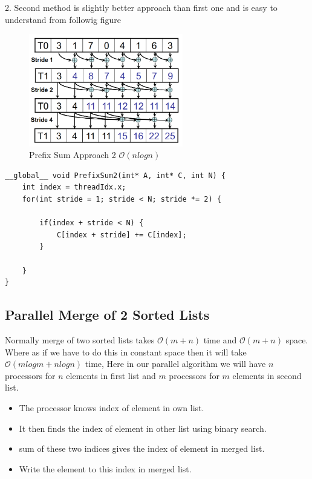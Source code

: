 \newpage

2. Second method is slightly better approach than first one and is easy to understand from followig figure

\begin{figure}[h]
    \centering
    \includegraphics[width=0.6\textwidth]{Images/prefix2method.png}
    \caption{Prefix Sum Approach 2 $\mathcal{O}(nlogn)$}
\end{figure}


\begin{lstlisting}
__global__ void PrefixSum2(int* A, int* C, int N) {
    int index = threadIdx.x;
    for(int stride = 1; stride < N; stride *= 2) {

        if(index + stride < N) {
            C[index + stride] += C[index];
        }

    }
}
\end{lstlisting}

\subsection*{Parallel Merge of 2 Sorted Lists}
Normally merge of two sorted lists takes $\mathcal{O}(m+n)$ time and $\mathcal{O}(m+n)$ space. Where as if we have to do this in constant space then it will take $\mathcal{O}(mlogm + nlogn)$ time, Here in our parallel algorithm we will have $n$ processors for $n$ elements in first list and $m$ processors for $m$ elements in second list.

\begin{itemize}
    \item The processor knows index of element in own list.
    \item It then finds the index of element in other list using binary search.
    \item sum of these two indices gives the index of element in merged list.
    \item Write the element to this index in merged list.
\end{itemize}

